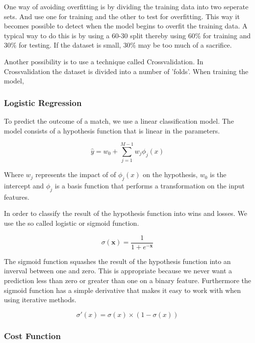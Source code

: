 One way of avoiding overfitting is by dividing the training data into two seperate sets.
And use one for training and the other to test for overfitting. 
This way it becomes possible to detect when the model begins to overfit the training data.
A typical way to do this is by using a 60-30 split thereby using 60\% for training and 30\% for testing.
If the dataset is small, 30\% may be too much of a sacrifice.

Another possibility is to use a technique called Crossvalidation.
In Crossvalidation the dataset is divided into a number of 'folds'.
When training the model,  









\subsubsection{Logistic Regression}\label{sec:logistic}
To predict the outcome of a match, we use a linear classification model.
The model consists of a hypothesis function that is linear in the parameters.

\[ \hat{y} = w_0 + \sum_{j=1}^{M-1} w_j \phi_j(x) \]

Where $w_j$ represents the impact of of $\phi_j(x)$ on the hypothesis,
$w_0$ is the intercept and $\phi_j$ is a basis function that
performs a transformation on the input features. 


In order to classify the result of the hypothesis function into wins and losses. 
We use the so called logistic or sigmoid function.

\[ \sigma(\textbf{x}) = \frac{1}{1+e^{- \textbf{x}}} \]

The sigmoid function squashes the result of the hypothesis function into an inverval between one and zero.
This is appropriate because we never want a prediction less than zero or greater than one on a binary feature.
Furthermore the sigmoid function has a simple derivative that makes it easy to work with when using iterative methods.

\[ \sigma'(x) = \sigma(x) \times (1-\sigma(x)) \] 

\subsubsection{Cost Function}

